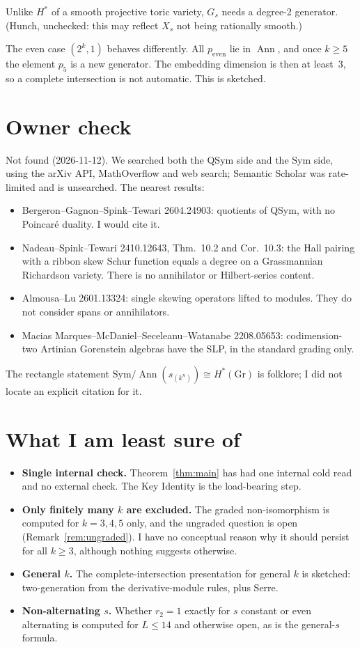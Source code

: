 \documentclass[11pt]{amsart}
\newcommand{\gr}[1]{\textsf{#1}}
\newcommand{\Sym}{\mathrm{Sym}}
\newcommand{\Ann}{\operatorname{Ann}}
\newcommand{\Gr}{\mathrm{Gr}}
\theoremstyle{plain}
\theoremstyle{definition}
\begin{document}
Unlike $H^*$ of a smooth projective toric variety, $G_s$ needs a degree-2 generator. (Hunch, unchecked: this may reflect $X_s$ not being rationally smooth.)

The even case $(2^k,1)$ behaves differently. All $p_{\mathrm{even}}$ lie in $\Ann$, and once $k\ge5$ the element $p_5$ is a new generator. The embedding dimension is then at least~3, so a complete intersection is not automatic. This is \gr{sketched}.

\section{Owner check}\label{sec:owner}
\gr{Not found} (2026-11-12). We searched both the QSym side and the Sym side, using the arXiv API, MathOverflow and web search; Semantic Scholar was rate-limited and is unsearched. The nearest results:
\begin{itemize}[leftmargin=1.2em,itemsep=1pt]
\item Bergeron--Gagnon--Spink--Tewari 2604.24903: quotients of QSym, with no Poincar\'e duality. I would cite it.
\item Nadeau--Spink--Tewari 2410.12643, Thm.~10.2 and Cor.~10.3: the Hall pairing with a ribbon skew Schur function equals a degree on a Grassmannian Richardson variety. There is no annihilator or Hilbert-series content.
\item Almousa--Lu 2601.13324: single skewing operators lifted to modules. They do not consider spans or annihilators.
\item Macias Marques--McDaniel--Seceleanu--Watanabe 2208.05653: codimension-two Artinian Gorenstein algebras have the SLP, in the standard grading only.
\end{itemize}
The rectangle statement $\Sym/\Ann(s_{(k^n)})\cong H^*(\Gr)$ is folklore; I did not locate an explicit citation for it.

\section{What I am least sure of}
\begin{itemize}[leftmargin=1.2em,itemsep=1pt]
\item \textbf{Single internal check.} Theorem~\ref{thm:main} has had one internal cold read and no external check. The Key Identity is the load-bearing step.
\item \textbf{Only finitely many $k$ are excluded.} The graded non-isomorphism is \gr{computed} for $k=3,4,5$ only, and the ungraded question is open (Remark~\ref{rem:ungraded}). I have no conceptual reason why it should persist for all $k\ge3$, although nothing suggests otherwise.
\item \textbf{General $k$.} The complete-intersection presentation for general $k$ is \gr{sketched}: two-generation from the derivative-module rules, plus Serre.
\item \textbf{Non-alternating $s$.} Whether $r_2=1$ exactly for $s$ constant or even alternating is \gr{computed} for $L\le14$ and otherwise open, as is the general-$s$ formula.
\end{itemize}
\end{document}
